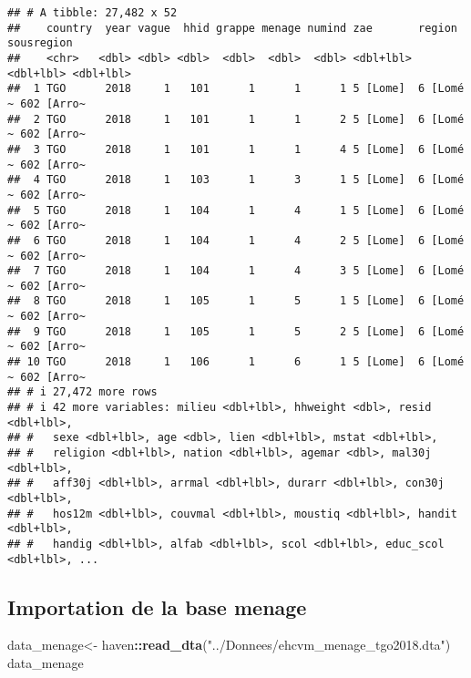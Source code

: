 \documentclass[
]{article}
\newenvironment{Shaded}{\begin{snugshade}}{\end{snugshade}}
\newcommand{\FunctionTok}[1]{\textcolor[rgb]{0.13,0.29,0.53}{\textbf{#1}}}
\newcommand{\NormalTok}[1]{#1}
\newcommand{\OtherTok}[1]{\textcolor[rgb]{0.56,0.35,0.01}{#1}}
\newcommand{\SpecialCharTok}[1]{\textcolor[rgb]{0.81,0.36,0.00}{\textbf{#1}}}
\newcommand{\StringTok}[1]{\textcolor[rgb]{0.31,0.60,0.02}{#1}}
\begin{document}
\begin{verbatim}
## # A tibble: 27,482 x 52
##    country  year vague  hhid grappe menage numind zae       region    sousregion
##    <chr>   <dbl> <dbl> <dbl>  <dbl>  <dbl>  <dbl> <dbl+lbl> <dbl+lbl> <dbl+lbl> 
##  1 TGO      2018     1   101      1      1      1 5 [Lome]  6 [Lomé ~ 602 [Arro~
##  2 TGO      2018     1   101      1      1      2 5 [Lome]  6 [Lomé ~ 602 [Arro~
##  3 TGO      2018     1   101      1      1      4 5 [Lome]  6 [Lomé ~ 602 [Arro~
##  4 TGO      2018     1   103      1      3      1 5 [Lome]  6 [Lomé ~ 602 [Arro~
##  5 TGO      2018     1   104      1      4      1 5 [Lome]  6 [Lomé ~ 602 [Arro~
##  6 TGO      2018     1   104      1      4      2 5 [Lome]  6 [Lomé ~ 602 [Arro~
##  7 TGO      2018     1   104      1      4      3 5 [Lome]  6 [Lomé ~ 602 [Arro~
##  8 TGO      2018     1   105      1      5      1 5 [Lome]  6 [Lomé ~ 602 [Arro~
##  9 TGO      2018     1   105      1      5      2 5 [Lome]  6 [Lomé ~ 602 [Arro~
## 10 TGO      2018     1   106      1      6      1 5 [Lome]  6 [Lomé ~ 602 [Arro~
## # i 27,472 more rows
## # i 42 more variables: milieu <dbl+lbl>, hhweight <dbl>, resid <dbl+lbl>,
## #   sexe <dbl+lbl>, age <dbl>, lien <dbl+lbl>, mstat <dbl+lbl>,
## #   religion <dbl+lbl>, nation <dbl+lbl>, agemar <dbl>, mal30j <dbl+lbl>,
## #   aff30j <dbl+lbl>, arrmal <dbl+lbl>, durarr <dbl+lbl>, con30j <dbl+lbl>,
## #   hos12m <dbl+lbl>, couvmal <dbl+lbl>, moustiq <dbl+lbl>, handit <dbl+lbl>,
## #   handig <dbl+lbl>, alfab <dbl+lbl>, scol <dbl+lbl>, educ_scol <dbl+lbl>, ...
\end{verbatim}

\subsection{Importation de la base
menage}\label{importation-de-la-base-menage-1}

\begin{Shaded}
\begin{Highlighting}[]
\NormalTok{data\_menage}\OtherTok{\textless{}{-}}\NormalTok{ haven}\SpecialCharTok{::}\FunctionTok{read\_dta}\NormalTok{(}\StringTok{"../Donnees/ehcvm\_menage\_tgo2018.dta"}\NormalTok{)}
\NormalTok{data\_menage}
\end{Highlighting}
\end{Shaded}
\end{document}
